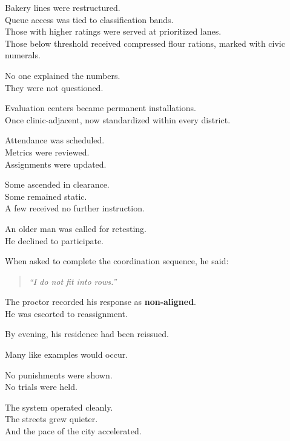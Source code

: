 \documentclass[12pt]{article}
\begin{document}
\vspace{1em}

Bakery lines were restructured.\\
Queue access was tied to classification bands.\\
Those with higher ratings were served at prioritized lanes.\\
Those below threshold received compressed flour rations, marked with civic numerals.

No one explained the numbers.\\
They were not questioned.

\vspace{1em}

Evaluation centers became permanent installations.\\
Once clinic-adjacent, now standardized within every district.

Attendance was scheduled.\\
Metrics were reviewed.\\
Assignments were updated.

Some ascended in clearance.\\
Some remained static.\\
A few received no further instruction.

\vspace{1em}

An older man was called for retesting.\\
He declined to participate.

When asked to complete the coordination sequence, he said:

\begin{quote}
\textit{“I do not fit into rows.”}
\end{quote}

The proctor recorded his response as \textbf{non-aligned}.\\
He was escorted to reassignment.

By evening, his residence had been reissued.

\vspace{1em}

Many like examples would occur.

\vspace{1em}

No punishments were shown.\\
No trials were held.

The system operated cleanly.\\
The streets grew quieter.\\
And the pace of the city accelerated.
\end{document}
